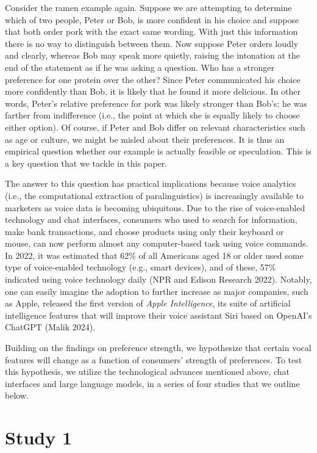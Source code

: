 \documentclass[
  a4paper,
]{scrreprt}
\begin{document}
Consider the ramen example again. Suppose we are attempting to determine
which of two people, Peter or Bob, is more confident in his choice and
suppose that both order pork with the exact same wording. With just this
information there is no way to distinguish between them. Now suppose
Peter orders loudly and clearly, whereas Bob may speak more quietly,
raising the intonation at the end of the statement as if he was asking a
question. Who has a stronger preference for one protein over the other?
Since Peter communicated his choice more confidently than Bob, it is
likely that he found it more delicious. In other words, Peter's relative
preference for pork was likely stronger than Bob's; he was farther from
indifference (i.e., the point at which she is equally likely to choose
either option). Of course, if Peter and Bob differ on relevant
characteristics such as age or culture, we might be misled about their
preferences. It is thus an empirical question whether our example is
actually feasible or speculation. This is a key question that we tackle
in this paper.

The answer to this question has practical implications because voice
analytics (i.e., the computational extraction of paralinguistics) is
increasingly available to marketers as voice data is becoming
ubiquitous. Due to the rise of voice-enabled technology and chat
interfaces, consumers who used to search for information, make bank
transactions, and choose products using only their keyboard or mouse,
can now perform almost any computer-based task using voice commands. In
2022, it was estimated that 62\% of all Americans aged 18 or older used
some type of voice-enabled technology (e.g., smart devices), and of
these, 57\% indicated using voice technology daily (NPR and Edison
Research 2022). Notably, one can easily imagine the adoption to further
increase as major companies, such as Apple, released the first version
of \emph{Apple Intelligence}, its suite of artificial intelligence
features that will improve their voice assistant Siri based on OpenAI's
ChatGPT (Malik 2024).

Building on the findings on preference strength, we hypothesize that
certain vocal features will change as a function of consumers' strength
of preferences. To test this hypothesis, we utilize the technological
advances mentioned above, chat interfaces and large language models, in
a series of four studies that we outline below.

\hypertarget{study-1}{%
\section{Study 1}\label{study-1}}
\end{document}
